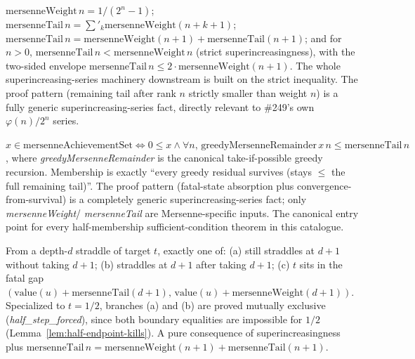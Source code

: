 \begin{lem}
\label{lem:mersenne-tail-weight}
$\mathrm{mersenneWeight}\,n = 1/(2^n-1)$; $\mathrm{mersenneTail}\,n = \sum'_k
\mathrm{mersenneWeight}(n{+}k{+}1)$; $\mathrm{mersenneTail}\,n =
\mathrm{mersenneWeight}(n{+}1)+\mathrm{mersenneTail}(n{+}1)$; and for $n>0$,
$\mathrm{mersenneTail}\,n<\mathrm{mersenneWeight}\,n$ (strict superincreasingness), with
the two-sided envelope $\mathrm{mersenneTail}\,n\le
2\cdot\mathrm{mersenneWeight}(n{+}1)$. The whole superincreasing-series machinery
downstream is built on the strict inequality. The proof pattern (remaining tail after
rank $n$ strictly smaller than weight $n$) is a fully generic superincreasing-series fact,
directly relevant to \#249's own $\varphi(n)/2^n$ series.
\par{}
\end{lem}

\begin{thm}
\label{thm:greedy-survival-catalogue}
$x\in\mathrm{mersenneAchievementSet} \iff 0\le x \land \forall n,\,
\mathrm{greedyMersenneRemainder}\,x\,n \le \mathrm{mersenneTail}\,n$, where
\emph{greedyMersenneRemainder} is the canonical take-if-possible greedy recursion.
Membership is exactly ``every greedy residual survives (stays $\le$ the full remaining
tail)''. The proof pattern (fatal-state absorption plus convergence-from-survival) is a
completely generic superincreasing-series fact; only \emph{mersenneWeight}/
\emph{mersenneTail} are Mersenne-specific inputs. The canonical entry point for every
half-membership sufficient-condition theorem in this catalogue.
\par{}
\end{thm}

\begin{lem}
\label{lem:rank-step-trichotomy}
From a depth-$d$ straddle of target $t$, exactly one of: (a) still straddles at $d{+}1$
without taking $d{+}1$; (b) straddles at $d{+}1$ after taking $d{+}1$; (c) $t$ sits in the
fatal gap $(\mathrm{value}(u)+\mathrm{mersenneTail}(d{+}1),\,
\mathrm{value}(u)+\mathrm{mersenneWeight}(d{+}1))$. Specialized to $t=1/2$, branches (a)
and (b) are proved mutually exclusive (\emph{half\_step\_forced}), since both boundary
equalities are impossible for $1/2$
(Lemma~\ref{lem:half-endpoint-kills}). A pure consequence of superincreasingness plus
$\mathrm{mersenneTail}\,n = \mathrm{mersenneWeight}(n{+}1)+\mathrm{mersenneTail}(n{+}1)$.
\par{}
\end{lem}

